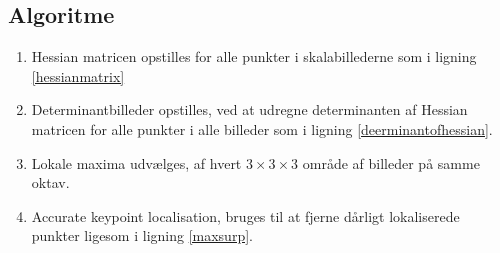 \subsection*{Algoritme}
\begin{enumerate}
\item {Hessian matricen opstilles for alle punkter i skalabillederne som i ligning \eqref{hessianmatrix}}
\item Determinantbilleder opstilles, ved at udregne determinanten af Hessian matricen for alle punkter i alle billeder som i ligning \eqref{deerminantofhessian}.
\item Lokale maxima udvælges, af hvert $3\times3\times3$ område af billeder på samme oktav.
\item Accurate keypoint localisation, bruges til at fjerne dårligt lokaliserede punkter ligesom i ligning \eqref{maxsurp}.
\end{enumerate}